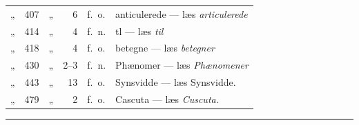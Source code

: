 \documentclass[12pt,a4paper]{book}
\newcommand{\streg}{\begin{center}\rule{2cm}{0.4pt}\end{center}}
\begin{document}
\begin{center}
\begin{tabular}{@{}l r l r l l@{}}
„ & 407 & „ & 6 & f.\ o. & anticulerede --- læs \emph{articulerede}\\
„ & 414 & „ & 4 & f.\ n. & tl --- læs \emph{til}\\
„ & 418 & „ & 4 & f.\ o. & betegne --- læs \emph{betegner}\\
„ & 430 & „ & 2--3 & f.\ n. & Phænomer --- læs \emph{Phænomener}\\
„ & 443 & „ & 13 & f.\ o. & Synsvidde --- læs Synsvidde.\\
„ & 479 & „ & 2 & f.\ o. & Cascuta --- læs \emph{Cuscuta.}\\
\end{tabular}
\end{center}
\endgroup

\streg  %
\end{document}
